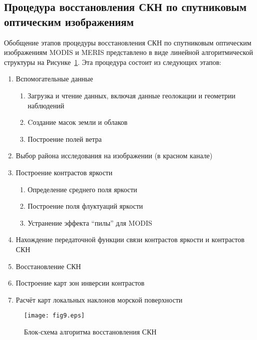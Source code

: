 \subsection{Процедура восстановления СКН по спутниковым оптическим изображениям}

Обобщение этапов процедуры восстановления СКН по спутниковым оптическим изображениям MODIS и MERIS представлено в виде линейной алгоритмической структуры на Рисунке~\ref{fig:9}. Эта процедура состоит из следующих этапов:



\begin{enumerate}
\item Вспомогательные данные
	\begin{enumerate}
		\item Загрузка и чтение данных, включая данные геолокации и геометрии наблюдений
		\item Cоздание масок земли и облаков
		\item Построение полей ветра
	\end{enumerate}
\item Выбор района исследования на изображении (в красном канале)
\item Построение контрастов яркости
	\begin{enumerate}
		\item Определение среднего поля яркости
		\item Построение поля флуктуаций яркости
		\item Устранение эффекта ``пилы'' для MODIS
	\end{enumerate}
\item Нахождение передаточной функции связи контрастов яркости и контрастов СКН
\item Восстановление СКН
\item Построение карт зон инверсии контрастов
\item Расчёт карт локальных наклонов морской поверхности
\end{enumerate}



\begin{figure}[H]
    \texttt{[image: fig9.eps]}
    \caption{Блок-схема алгоритма восстановления СКН}
    \label{fig:9}
\end{figure}



